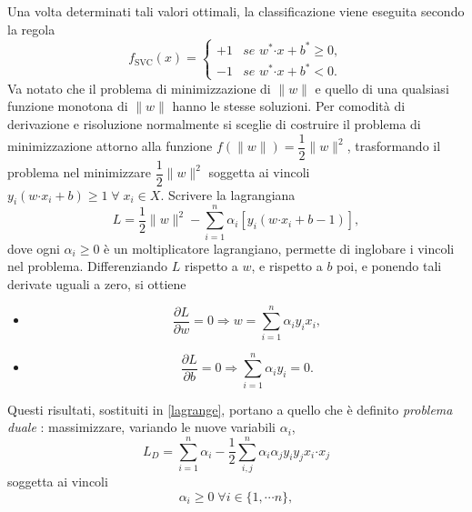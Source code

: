 \documentclass [11pt,a4paper,twoside,openright] {book}
\begin{document}
Una volta determinati tali valori ottimali, la classificazione viene eseguita secondo la regola
\begin{equation}\label{fsvm}
f_\mathrm{SVC}(x)=
\begin{cases}
+1 & \textit{se } w^* \boldsymbol{\cdot} x + b^* \geq 0, \\
-1 & \textit{se } w^* \boldsymbol{\cdot} x  + b^*< 0.
\end{cases}
\end{equation}
Va notato che il problema di minimizzazione di $\parallel w \parallel$ e quello di una qualsiasi funzione monotona di $\parallel w \parallel$ hanno le stesse soluzioni. Per comodità di derivazione e risoluzione normalmente si sceglie di costruire il problema di minimizzazione attorno alla funzione $f(\parallel w \parallel) = \dfrac{1}{2}\parallel w \parallel ^2$, trasformando il problema nel minimizzare $\dfrac{1}{2}\parallel w \parallel ^2$ soggetta ai vincoli $ y_i(w\boldsymbol{\cdot}x_i + b) \geq 1 \; \forall \; x_i \in X$. Scrivere la lagrangiana
\begin{equation}
\label{lagrange}
L = \dfrac{1}{2}\parallel w\parallel ^2 - \sum_{i=1}^n \alpha_i [y_i(w \boldsymbol{\cdot} x_i +b -1)],
\end{equation}
dove ogni $\alpha_i \geq 0$ è un moltiplicatore lagrangiano, permette di inglobare i vincoli nel problema. Differenziando $L$ rispetto a $w$, e rispetto a $b$ poi, e ponendo tali derivate uguali a zero, si ottiene
\begin{itemize}
\item[]\begin{equation}\label{w}
\dfrac{{\partial L}}{{\partial w}} = 0 \Longrightarrow w = \sum_{i=1}^n \alpha_i y_i x_i,
\end{equation}
\item[]\begin{equation}\label{b}\dfrac{\partial L}{\partial b} = 0 \Longrightarrow \sum_{i=1}^n \alpha_i y_i = 0.
\end{equation}
\end{itemize}
Questi risultati, sostituiti in \eqref{lagrange}, portano a quello che è definito \textit{problema duale} \cite{fletcher1987practical}: massimizzare, variando le nuove variabili $\alpha_i$,
\begin{equation}\label{duale}
L_D = \sum_{i=1}^n \alpha_i -\dfrac{1}{2} \sum_{i,j}^n \alpha_i \alpha_j y_i y_j x_i \boldsymbol{\cdot} x_j
\end{equation}
soggetta ai vincoli
\begin{equation}
\alpha_i \geq 0 \; \forall i \in \lbrace 1, \cdots n \rbrace,
\end{equation}
\end{document}
